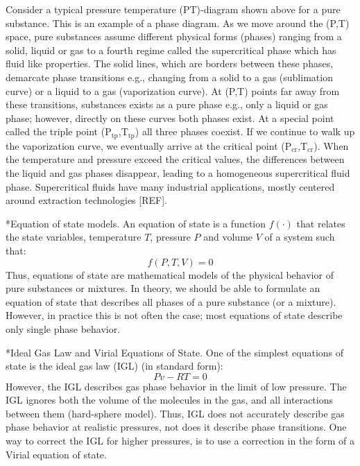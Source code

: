 \documentclass[11pt]{article}
\makeatletter
\theoremstyle{definition}
\renewcommand\subsection{\@startsection
	{subsection}{2}{0mm}
	{-0.05in}
	{0.5\baselineskip}
	{\normalfont\normalsize\bfseries}}
\renewcommand\subsubsection{\@startsection
	{subsubsection}{2}{0mm}
	{-0.05in}
	{-0.5\baselineskip}
	{\normalfont\normalsize\bfseries}}
\makeatother
\begin{document}
Consider a typical pressure temperature (PT)-diagram shown above for a pure substance.
This is an example of a phase diagram.
As we move around the (P,T) space, pure substances assume different physical forms (phases) ranging from a solid, liquid or gas to a fourth regime
called the supercritical phase which has fluid like properties.
The solid lines, which are borders between these phases, demarcate phase transitions e.g., changing from a solid to a gas (sublimation curve)
or a liquid to a gas (vaporization curve).
At (P,T) points far away from these transitions, substances exists as a pure phase e.g., only a liquid or gas phase;
however, directly on these curves both phases exist.
At a special point called the triple point (P$_{\mathrm{tp}}$,T$_{\mathrm{tp}}$)
all three phases coexist. If we continue to walk up the vaporization curve, we eventually arrive at the critical point (P$_{\mathrm{cr}}$,T$_{\mathrm{cr}}$).
When the temperature and pressure exceed the critical values, the differences between the liquid and gas phases disappear,
leading to a homogeneous supercritical fluid phase.
Supercritical fluids have many industrial applications, mostly centered around extraction technologies [REF].


\subsection*{Equation of state models.}
An equation of state is a function $f(\cdot)$ that relates the state variables, temperature $T$, pressure $P$ and volume $V$ of a system such that:
\begin{equation}
f\left(P,T,V\right) = 0
\end{equation}
Thus, equations of state are mathematical models of the physical behavior of pure substances or mixtures.
In theory, we should be able to formulate an equation of state that describes all phases of a pure substance (or a mixture).
However, in practice this is not often the case; most equations of state describe only single phase behavior.

\subsubsection*{Ideal Gas Law and Virial Equations of State.}
One of the simplest equations of state is the ideal gas law (IGL) (in standard form):
\begin{equation}
  Pv-RT = 0
\end{equation}
However, the IGL describes gas phase behavior in the limit of low pressure.
The IGL ignores both the volume of the molecules in the gas, and all interactions between them (hard-sphere model).
Thus, IGL does not accurately describe gas phase behavior at realistic pressures, not does it describe phase transitions.
One way to correct the IGL for higher pressures, is to use a correction in the form of a Virial equation of state.
\end{document}
